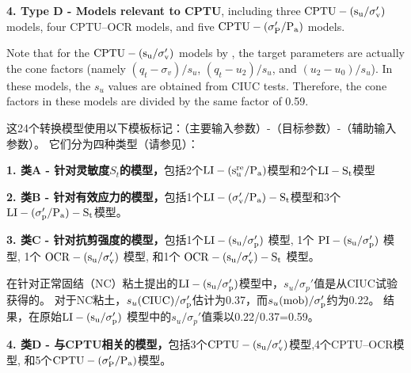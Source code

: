 \begin{Parallel}{0.60\textwidth}{}
{        \textbf{4. Type D - Models relevant to CPTU}, including three $\rm{CPTU}-(s_u/\sigma_v')$ models, four CPTU–OCR models, \quad and five $\rm{CPTU-(\sigma_P'/P_a)}$ models. 
        
        Note that for the $\rm{CPTU}-(s_u/\sigma_v')$ models by \citet{Ching201252}, the target parameters are actually the cone factors (namely $(q_t-\sigma_v)/s_u$, $(q_t-u_2)/s_u$, and $(u_2-u_0)/s_u$). In these models, the $s_u$ values are obtained from CIUC tests. Therefore, the cone factors in these models are divided by the same factor of 0.59.
    }
    \ParallelRText
    {
        这24个转换模型使用以下模板标记：（主要输入参数）-（目标参数）-（辅助输入参数）。 它们分为四种类型（请参见）：

        \textbf{1. 类A - 针对灵敏度$S_t$的模型，}包括2个$\rm{LI}-(s_u^{re}/P_a)$模型和2个$\rm{LI}-S_t$模型

        \textbf{2. 类B - 针对有效应力的模型，}包括1个$\rm{LI}-(\sigma_v'/P_a)-S_t$模型和3个$\rm{LI}-(\sigma_p'/P_a)-S_t$模型。

        \textbf{3. 类C - 针对抗剪强度的模型，}包括1个$\rm{LI}-(s_u/\sigma_p')$ 模型, 1个 $\rm{PI}-(s_u/\sigma_p')$ 模型, 1个 $\rm{OCR}-(s_u/\sigma_v')$ 模型, 和1个 $\rm{OCR}-(s_u/\sigma_v')-S_t$ 模型。

        在\citet{Bjerrum1960711}针对正常固结（NC）粘土提出的$\rm{LI}-(s_u/\sigma_p')$模型中，$s_u/\sigma_p'$值是从CIUC试验获得的。 对于NC粘土，$s_u(\rm{CIUC})/\sigma_p'$估计为0.37，而$s_u(\rm{mob})/\sigma_p'$约为0.22\citep{Mesri1975409}。 结果，\citet{Bjerrum1960711}在原始$\rm{LI}-(s_u/\sigma_p')$ 模型中的$s_u/\sigma_p'$值乘以0.22/0.37=0.59。

        \textbf{4. 类D - 与CPTU相关的模型，}包括3个$\rm{CPTU}-(s_u/\sigma_v')$模型,4个CPTU–OCR模型, 和5个$\rm{CPTU-(\sigma_P'/P_a)}$模型。

}
\end{Parallel}
